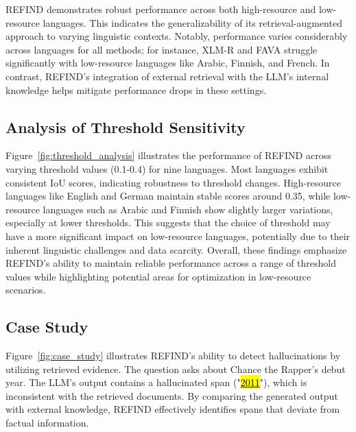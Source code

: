 REFIND demonstrates robust performance across both high-resource and low-resource languages. This indicates the generalizability of its retrieval-augmented approach to varying linguistic contexts.  Notably, performance varies considerably across languages for all methods; for instance, XLM-R and FAVA struggle significantly with low-resource languages like Arabic, Finnish, and French. In contrast, REFIND's integration of external retrieval with the LLM's internal knowledge helps mitigate performance drops in these settings.




\subsection{Analysis of Threshold Sensitivity}

Figure~\ref{fig:threshold_analysis} illustrates the performance of REFIND across varying threshold values (0.1-0.4) for nine languages.
Most languages exhibit consistent IoU scores, indicating robustness to threshold changes. High-resource languages like English and German maintain stable scores around 0.35, while low-resource languages such as Arabic and Finnish show slightly larger variations, especially at lower thresholds. 
This suggests that the choice of threshold may have a more significant impact on low-resource languages, potentially due to their inherent linguistic challenges and data scarcity. 
Overall, these findings emphasize REFIND's ability to maintain reliable performance across a range of threshold values while highlighting potential areas for optimization in low-resource scenarios.


\subsection{Case Study}
\label{sec:case_study}

Figure~\ref{fig:case_study} illustrates REFIND's ability to detect hallucinations by utilizing retrieved evidence. The question asks about Chance the Rapper's debut year. The LLM's output contains a hallucinated span ("\underline{\hl{2011}}"), which is inconsistent with the retrieved documents. By comparing the generated output with external knowledge, REFIND effectively identifies spans that deviate from factual information. 
